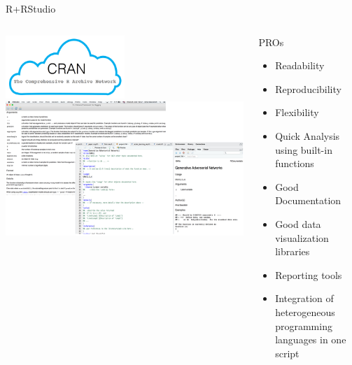 \documentclass[aspectratio=169,10pt]{beamer}
\begin{document}
\begin{frame}[fragile]{R+RStudio}
\begin{columns}
\begin{column}{0.65\textwidth}
\centering
\includegraphics[width=0.5\textwidth]{amal-fr0.png}
\\
\includegraphics[width=\textwidth]{amal-fr2.pdf}
\end{column}
\begin{column}{0.35\textwidth}
 \begin{alertblock}{PROs}
\begin{itemize}
    \item Readability
    \item Reproducibility 
     \item Flexibility
    \item Quick Analysis using built-in functions
   \item  Good Documentation
\item  Good data visualization libraries 
\item Reporting tools 
\item Integration of heterogeneous programming languages in one script 


\end{itemize}
\end{alertblock}
\end{column}
\end{columns}
\end{frame}
\end{document}
